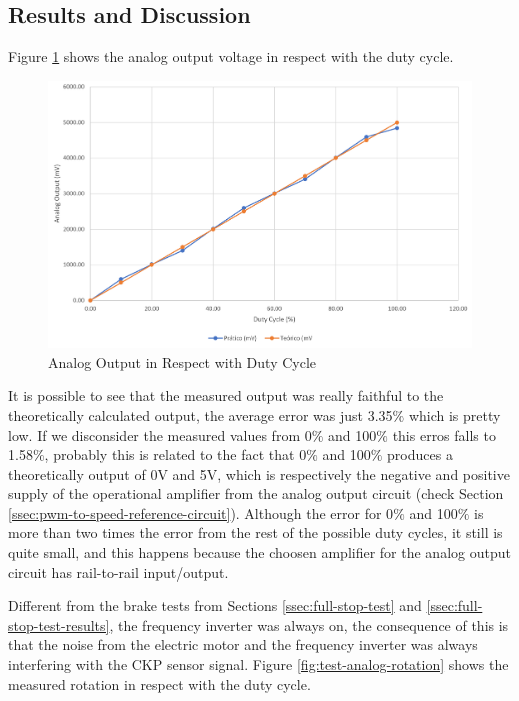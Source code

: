 	\subsection{Results and Discussion}\label{sec:duty-cycle-test-results}
		Figure \ref{fig:test-analog-voltage} shows the analog output voltage in respect with the duty cycle.

		\begin{figure}[htbp]
				\centering
				\includegraphics[width=1\textwidth]{figuras/fig-test-analog-voltage}
				\caption{Analog Output in Respect with Duty Cycle}
				\label{fig:test-analog-voltage}
		\end{figure}

		It is possible to see that the measured output was really faithful to the theoretically calculated output, the average error was just 3.35$\%$ which is pretty low. If we disconsider the measured values from 0$\%$ and 100$\%$ this erros falls to 1.58$\%$, probably this is related to the fact that 0$\%$ and 100$\%$ produces a theoretically output of 0V and 5V, which is respectively the negative and positive supply of the operational amplifier from the analog output circuit (check Section \ref{ssec:pwm-to-speed-reference-circuit}). Although the error for 0$\%$ and 100$\%$ is more than two times the error from the rest of the possible duty cycles, it still is quite small, and this happens because the choosen amplifier for the analog output circuit has rail-to-rail input/output.
		\par

		Different from the brake tests from Sections \ref{ssec:full-stop-test} and \ref{ssec:full-stop-test-results}, the frequency inverter was always on, the consequence of this is that the noise from the electric motor and the frequency inverter was always interfering with the CKP sensor signal. Figure \ref{fig:test-analog-rotation} shows the measured rotation in respect with the duty cycle.

